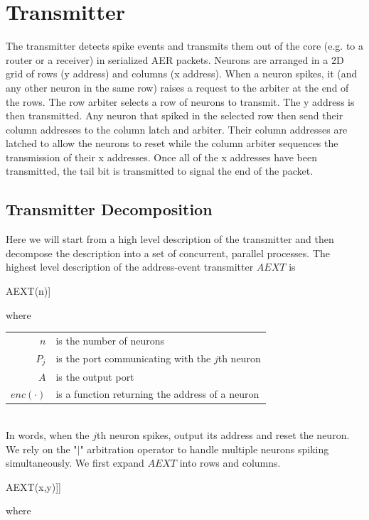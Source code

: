 \documentclass[aer.tex]{subfiles}
\begin{document}
\section{Transmitter}
The transmitter detects spike events and transmits
them out of the core (e.g. to a router or a receiver) in serialized AER
packets. Neurons are arranged in a 2D grid of rows (y address) and columns 
(x address). 
When a neuron spikes, it (and any other neuron in the same row) raises a 
request to the arbiter at the end of the rows. 
The row arbiter selects a row of neurons to transmit. The 
y address is then transmitted. Any neuron that spiked in the 
selected row then send their column addresses to the column latch and arbiter.
Their column addresses are latched to allow the neurons to reset while the 
column arbiter sequences the transmission of their x addresses. Once all of the
x addresses have been transmitted, the tail bit is transmitted to signal the 
end of the packet.

\subsection{Transmitter Decomposition}
Here we will start from a high level description of the transmitter and then decompose
the description into a set of concurrent, parallel processes. 
The highest level description of the address-event transmitter $AEXT$ is

\begin{csp}
AEXT(n)\equiv*[[\langle\|\,j:1..n:#{P`j}->A!enc(j)\pll\,P`j\rangle]]
\end{csp}
where 

\begin{tabular}[]{rl}
$n$ & is the number of neurons \\
$P_j$ & is the port communicating with the $j$th neuron \\
$A$ & is the output port \\
$enc(\cdot)$ & is a function returning the address of a neuron \\
\end{tabular} \\

In words, when the $j$th neuron spikes, output its address and reset the neuron. 
We rely on the "$\vert$" arbitration operator to handle multiple neurons spiking simultaneously.
We first expand $AEXT$ into rows and columns.

\begin{csp}
AEXT(x,y)\equiv*[[\langle\|\,l:1..y:\langle|k:1..x:#{P`{l\cdot\,k}}\rangle->A`1!enc(l)
               ,[\langle\|\,k:1..x:#{P`{l\cdot\,k}}->A`2!enc(k),P`{l\cdot\,k}\rangle]\rangle]]
\end{csp}
where 
\end{document}
